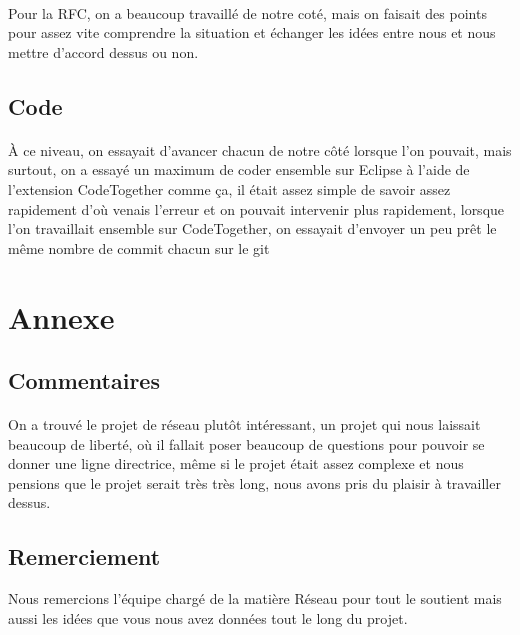 \documentclass[a4paper,titlepage]{report}
\begin{document}
\paragraph{}
Pour la RFC, on a beaucoup travaillé de notre coté, mais on faisait des points pour assez vite comprendre la situation et échanger les idées entre nous et nous mettre d'accord dessus ou non.
\subsection{Code}
\paragraph{}
À ce niveau, on essayait d'avancer chacun de notre côté lorsque l'on pouvait, mais surtout, on a essayé un maximum de coder ensemble sur Eclipse à l'aide de l'extension CodeTogether comme ça, il était assez simple de savoir assez rapidement d'où venais l'erreur et on pouvait intervenir plus rapidement, lorsque l'on travaillait ensemble sur CodeTogether, on essayait d'envoyer un peu prêt le même nombre de commit chacun sur le git
\section{Annexe}
\subsection{Commentaires}
\paragraph{}
On a trouvé le projet de réseau plutôt intéressant, un projet qui nous laissait beaucoup de liberté, où il fallait poser beaucoup de questions pour pouvoir se donner une ligne directrice, même si le projet était assez complexe et nous pensions que le projet serait très très long, nous avons pris du plaisir à travailler dessus.
\subsection{Remerciement}
Nous remercions l'équipe chargé de la matière Réseau pour tout le soutient mais aussi les idées que vous nous avez données tout le long du projet.
\end{document}
